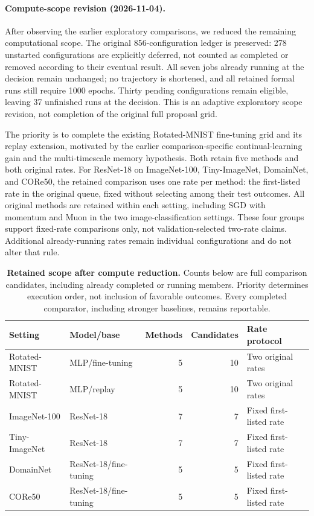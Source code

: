 \paragraph{Compute-scope revision (2026-11-04).}\label{app:reduced-scope}
After observing the earlier exploratory comparisons, we reduced the remaining computational scope. The original 856-configuration ledger is preserved: 278 unstarted configurations are explicitly deferred, not counted as completed or removed according to their eventual result. All seven jobs already running at the decision remain unchanged; no trajectory is shortened, and all retained formal runs still require 1000 epochs. Thirty pending configurations remain eligible, leaving 37 unfinished runs at the decision. This is an adaptive exploratory scope revision, not completion of the original full proposal grid.

The priority is to complete the existing Rotated-MNIST fine-tuning grid and its replay extension, motivated by the earlier comparison-specific continual-learning gain and the multi-timescale memory hypothesis. Both retain five methods and both original rates. For ResNet-18 on ImageNet-100, Tiny-ImageNet, DomainNet, and CORe50, the retained comparison uses one rate per method: the first-listed rate in the original queue, fixed without selecting among their test outcomes. All original methods are retained within each setting, including SGD with momentum and Muon in the two image-classification settings. These four groups support fixed-rate comparisons only, not validation-selected two-rate claims. Additional already-running rates remain individual configurations and do not alter that rule.

\begin{table}[htbp]\centering\footnotesize
\caption{\textbf{Retained scope after compute reduction.} Counts below are full comparison candidates, including already completed or running members. Priority determines execution order, not inclusion of favorable outcomes. Every completed comparator, including stronger baselines, remains reportable.}\label{tab:reduced-scope}
\begin{tabular}{llrrl}\toprule Setting & Model/base & Methods & Candidates & Rate protocol\\\midrule
Rotated-MNIST & MLP/fine-tuning & 5 & 10 & Two original rates\\
Rotated-MNIST & MLP/replay & 5 & 10 & Two original rates\\
ImageNet-100 & ResNet-18 & 7 & 7 & Fixed first-listed rate\\
Tiny-ImageNet & ResNet-18 & 7 & 7 & Fixed first-listed rate\\
DomainNet & ResNet-18/fine-tuning & 5 & 5 & Fixed first-listed rate\\
CORe50 & ResNet-18/fine-tuning & 5 & 5 & Fixed first-listed rate\\
\bottomrule\end{tabular}\end{table}

